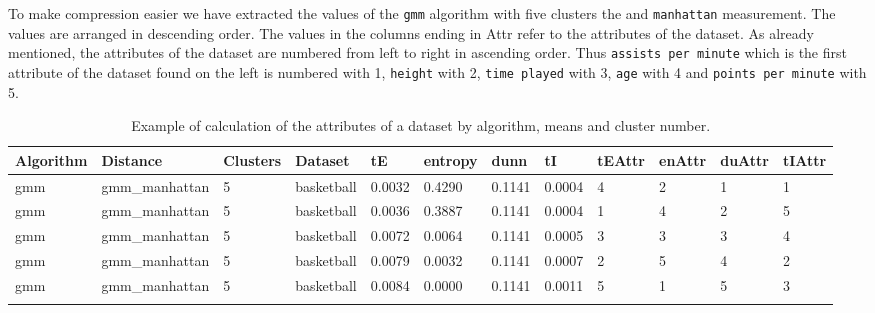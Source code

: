 To make compression easier we have extracted the values of the \texttt{gmm} algorithm with five clusters the and \texttt{manhattan} measurement. The values are arranged in descending order. The values in the columns ending in Attr refer to the attributes of the dataset. As already mentioned, the attributes of the dataset are numbered from left to right in ascending order. Thus \texttt{assists per minute} which is the first attribute of the dataset found on the left is numbered with 1, \texttt{height} with 2, \texttt{time played} with 3, \texttt{age} with 4 and \texttt{points per minute} with 5.

{\small
\begin{longtable}{| p{1cm} | p{1.8cm} | p{0.7cm} | p{0.9cm} | p{0.5cm} | p{0.65cm} | p{0.5cm} | p{0.5cm} | p{0.55cm} | p{0.55cm} | p{0.6cm} | p{0.5cm} |}
\hline
\scriptsize  Algorithm & \scriptsize  Distance  &  \scriptsize Clusters & \scriptsize  Dataset & \scriptsize tE & \scriptsize entropy & \scriptsize  dunn  & \scriptsize tI & \scriptsize tEAttr & \scriptsize enAttr & \scriptsize duAttr & \scriptsize tIAttr  \\
\hline
\scriptsize     gmm   & \scriptsize    gmm\_manhattan & \scriptsize    5    & \scriptsize basketball & \scriptsize    0.0032  &  \scriptsize 0.4290 & \scriptsize 0.1141 & \scriptsize    0.0004 & \scriptsize   4  & \scriptsize    2  & \scriptsize    1  & \scriptsize    1 \\
\scriptsize     gmm   & \scriptsize    gmm\_manhattan & \scriptsize    5    & \scriptsize basketball & \scriptsize    0.0036  &  \scriptsize 0.3887 & \scriptsize 0.1141 & \scriptsize    0.0004 & \scriptsize   1  & \scriptsize    4  & \scriptsize    2  & \scriptsize    5 \\
\scriptsize     gmm   & \scriptsize    gmm\_manhattan & \scriptsize    5    & \scriptsize basketball & \scriptsize    0.0072  &  \scriptsize 0.0064 & \scriptsize 0.1141 & \scriptsize    0.0005 & \scriptsize   3  & \scriptsize    3  & \scriptsize    3  & \scriptsize    4 \\
\scriptsize     gmm   & \scriptsize    gmm\_manhattan & \scriptsize    5    & \scriptsize basketball & \scriptsize    0.0079  &  \scriptsize 0.0032 & \scriptsize 0.1141 & \scriptsize    0.0007 & \scriptsize   2  & \scriptsize    5  & \scriptsize    4  & \scriptsize    2 \\
\scriptsize     gmm   & \scriptsize    gmm\_manhattan & \scriptsize    5    & \scriptsize basketball & \scriptsize    0.0084  &  \scriptsize 0.0000 & \scriptsize 0.1141 & \scriptsize    0.0011 & \scriptsize   5  & \scriptsize    1  & \scriptsize    5  & \scriptsize    3 \\
\hline
\caption{Example of calculation of the attributes of a dataset by algorithm, means and cluster number.}
\label{tab:clusteringExample}
\end{longtable}}
